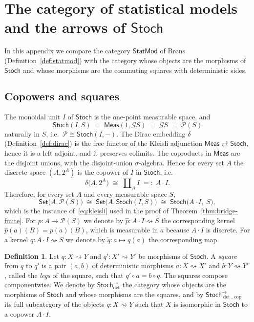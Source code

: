 \documentclass[11pt,a4paper]{article}
\theoremstyle{plain}
\theoremstyle{definition}
\newtheorem{definition}[theorem]{Definition}
\theoremstyle{remark}
\newcommand{\cat}[1]{\mathsf{#1}}
\newcommand{\Meas}{\cat{Meas}}
\newcommand{\Set}{\cat{Set}}
\newcommand{\Stoch}{\cat{Stoch}}
\newcommand{\G}{\mathcal{G}}
\newcommand{\Prb}{\mathcal{P}}
\newcommand{\del}{\delta}
\newcommand{\StatMod}{\cat{StatMod}}
\newcommand{\Arrdet}[1]{#1^{\rightarrow}_{\det}}
\newcommand{\Arrcop}[1]{#1^{\rightarrow}_{\det,\,\mathrm{cop}}}
\begin{document}
\appendix
\section{The category of statistical models and the arrows of
\texorpdfstring{$\Stoch$}{Stoch}}\label{sec:Bref}

In this appendix we compare the category $\StatMod$ of Br\o ns
(Definition~\ref{def:statmod}) with the category whose objects are the
morphisms of $\Stoch$ and whose morphisms are the commuting squares with
deterministic sides.

\subsection{Copowers and squares}

The monoidal unit $I$ of $\Stoch$ is the one-point measurable space, and
\[
\Stoch(I,S) \;=\; \Meas(1,\G S) \;=\; \G S \;=\; \Prb(S)
\]
naturally in $S$, i.e.\ $\Prb \cong \Stoch(I,-)$. The Dirac embedding $\del$
(Definition~\ref{def:dirac}) is the free functor of the Kleisli adjunction
$\Meas \rightleftarrows \Stoch$, hence it is a left adjoint, and it preserves
colimits. The coproducts in $\Meas$ are the disjoint unions, with the
disjoint-union $\sigma$-algebra. Hence for every set $A$ the discrete space
$(A,2^{A})$ is the copower of $I$ in $\Stoch$, i.e.
\[
\del\bigl(A,2^A \bigr) \;\cong\; \coprod\nolimits_{A} I \;=:\; A\cdot I .
\]
Therefore, for every set $A$ and every measurable space $S$,
\begin{equation}\label{eq:copower}
\Set\bigl(A,\Prb(S)\bigr)
\;\cong\;
\Set\bigl(A,\Stoch(I,S)\bigr)
\;\cong\;
\Stoch\bigl(A\cdot I,\;S\bigr),
\end{equation}
which is the instance of~\eqref{eq:kleisli} used in the proof of
Theorem~\ref{thm:bridge-finite}. For $p \colon A \to \Prb(S)$ we denote by
$\widehat{p} \colon A \cdot I \rightsquigarrow S$ the corresponding kernel
$\widehat{p}(a)(B) = p(a)(B)$, which is measurable in $a$ because $A \cdot I$ is
discrete. For a kernel $q \colon A \cdot I \rightsquigarrow S$ we denote by
$\check{q} \colon a \mapsto q(a)$ the corresponding map.

\begin{definition}\label{def:arrdet}
Let $q \colon X \rightsquigarrow Y$ and $q' \colon X' \rightsquigarrow Y'$ be
morphisms of $\Stoch$. A \emph{square} from $q$ to $q'$ is a pair $(a,b)$ of
deterministic morphisms $a \colon X \rightsquigarrow X'$ and
$b \colon Y \rightsquigarrow Y'$, called the \emph{legs} of the square, such
that $q' \circ a = b \circ q$. The squares compose componentwise. We denote by
$\Arrdet{\Stoch}$ the category whose objects are the morphisms of $\Stoch$ and
whose morphisms are the squares, and by $\Arrcop{\Stoch}$ its full subcategory
of the objects $q \colon X \rightsquigarrow Y$ such that $X$ is isomorphic in
$\Stoch$ to a copower $A \cdot I$.
\end{definition}
\end{document}
